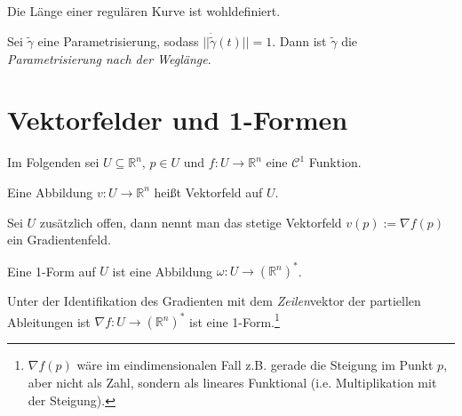 \begin{corollary}
	Die L\"ange einer regul\"aren Kurve ist wohldefiniert.
\end{corollary}

\begin{definition}
	Sei $\tilde\gamma$ eine Parametrisierung, sodass $||\dot{\tilde\gamma}(t)|| = 1$. Dann ist $\tilde\gamma$ die \textit{Parametrisierung nach der Wegl\"ange}.
\end{definition}






\section{Vektorfelder und 1-Formen}
Im Folgenden sei $U \subseteq \mathbb R^n$, $p \in U$ und $f: U\rightarrow \mathbb R^n$ eine $\mathcal C^1$ Funktion.
\begin{definition}[Vektorfeld]
	Eine Abbildung $v: U \rightarrow \mathbb R^n$ hei\ss t Vektorfeld auf $U$.
\end{definition}

\begin{definition}[Gradientenfeld]
	Sei $U$ zus\"atzlich offen, dann nennt man das stetige Vektorfeld $v(p) := \nabla f(p)$ ein Gradientenfeld.
\end{definition}

\begin{definition}[1-Form]
	Eine 1-Form auf $U$ ist eine Abbildung $\omega: U\rightarrow (\mathbb R^n)^*$.
\end{definition}

\begin{remark}
	Unter der Identifikation des Gradienten mit dem \textit{Zeilen}vektor der partiellen Ableitungen ist $\nabla f: U\rightarrow (\mathbb R^n)^*$ ist eine 1-Form.\footnote{$\nabla f(p)$ w\"are im eindimensionalen Fall z.B. gerade die Steigung im Punkt $p$, aber nicht als Zahl, sondern als lineares Funktional (i.e. Multiplikation mit der Steigung).}
\end{remark}

